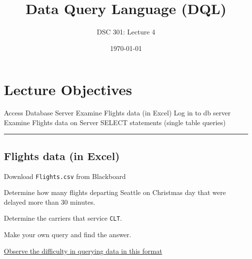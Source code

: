 \documentclass{article}
\newtheorem{definition}{Definition}
\begin{document}
\title{Data Query Language (DQL)}
\author{DSC 301: Lecture 4}
\date{\today}
\maketitle



\begin{outline}[enumerate]

\end{outline}
\begin{outline}
        
\end{outline}




\section*{Lecture Objectives}
\begin{outline}
        \1  Access Database Server
        \1  Examine Flights data (in Excel)
        \1  Log in to db server
        \1  Examine Flights data on Server
        \1  SELECT statements (single table queries)
\end{outline}

 \hspace{-0.5cm}\rule[-0.101in]{\textwidth}{0.0025in}















\subsection*{Flights data (in Excel)}
\begin{outline}
 \1 Download \texttt{Flights.csv} from Blackboard
 
 \1 Determine how many flights departing Seattle on Christmas day that were delayed more than 30 minutes.

 \1 Determine the carriers that service \texttt{CLT}.  
 
 \1 Make your own query and find the answer. 
 
 \1 \underline{Observe the difficulty in querying data in this format}  
\end{outline} 
\end{document}

